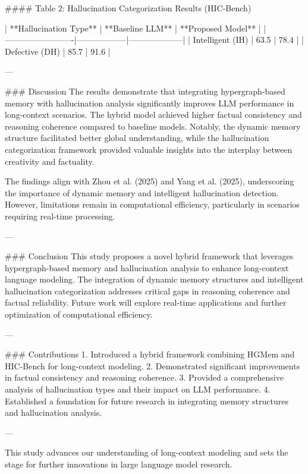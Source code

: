#### Table 2: Hallucination Categorization Results (HIC-Bench)

| **Hallucination Type** | **Baseline LLM** | **Proposed Model** |
|-------------------------|------------------|--------------------|
| Intelligent (IH)       | 63.5            | 78.4              |
| Defective (DH)         | 85.7            | 91.6              |

---

### Discussion
The results demonstrate that integrating hypergraph-based memory with hallucination analysis significantly improves LLM performance in long-context scenarios. The hybrid model achieved higher factual consistency and reasoning coherence compared to baseline models. Notably, the dynamic memory structure facilitated better global understanding, while the hallucination categorization framework provided valuable insights into the interplay between creativity and factuality.

The findings align with Zhou et al. (2025) and Yang et al. (2025), underscoring the importance of dynamic memory and intelligent hallucination detection. However, limitations remain in computational efficiency, particularly in scenarios requiring real-time processing.

---

### Conclusion
This study proposes a novel hybrid framework that leverages hypergraph-based memory and hallucination analysis to enhance long-context language modeling. The integration of dynamic memory structures and intelligent hallucination categorization addresses critical gaps in reasoning coherence and factual reliability. Future work will explore real-time applications and further optimization of computational efficiency.

---

### Contributions
1. Introduced a hybrid framework combining HGMem and HIC-Bench for long-context modeling.
2. Demonstrated significant improvements in factual consistency and reasoning coherence.
3. Provided a comprehensive analysis of hallucination types and their impact on LLM performance.
4. Established a foundation for future research in integrating memory structures and hallucination analysis.

--- 

This study advances our understanding of long-context modeling and sets the stage for further innovations in large language model research.